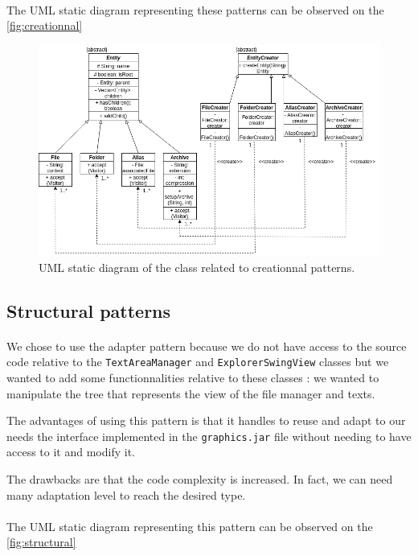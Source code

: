 \documentclass[a4paper, 11pt, oneside]{article}
\begin{document}
\paragraph{}The UML static diagram representing these patterns can be observed on the \autoref{fig:creationnal}

\begin{figure}[!ht]
    \centering
    \includegraphics[scale=0.6]{creationnal.png}
    \caption{UML static diagram of the class related to creationnal patterns.}\label{fig:creationnal}
\end{figure}

\subsection{Structural patterns}

\paragraph{}We chose to use the adapter pattern because we do not have access to the source code relative to the \texttt{TextAreaManager} and \texttt{ExplorerSwingView} classes but we wanted to add some functionnalities relative to these classes : we wanted to manipulate the tree that represents the view of the file manager and texts.

The advantages of using this pattern is that it handles to reuse and adapt to our needs the interface implemented in the \texttt{graphics.jar} file without needing to have access to it and modify it.

The drawbacks are that the code complexity is increased. In fact, we can need many adaptation level to reach the desired type. 

\paragraph{}The UML static diagram representing this pattern can be observed on the \autoref{fig:structural}
\end{document}
